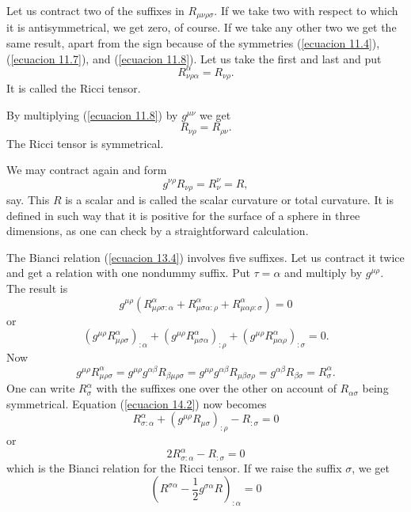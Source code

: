 Let us contract two of the suffixes in $R_{\mu\nu\rho\sigma}$. If we take two with respect to which it is 
antisymmetrical, we get zero, of course. If we take any other two we get the same result, apart from the sign because 
of the symmetries (\ref{ecuacion 11.4}), (\ref{ecuacion 11.7}), and (\ref{ecuacion 11.8}). Let us take the first and 
last and put
\[
R^{\alpha}_{\nu\rho\alpha} = R_{\nu\rho}.
\]
It is called the Ricci tensor.

By multiplying (\ref{ecuacion 11.8}) by $g^{\mu\nu}$ we get 
\begin{equation}
 \label{ecuacion 14.1}
 R_{\nu\rho} = R_{\rho\nu}.
\end{equation}
The Ricci tensor is symmetrical.

We may contract again and form
\[
g^{\nu\rho}R_{\nu\rho} = R^{\nu}_{\nu} = R,
\]
say. This $R$ is a scalar and is called the scalar curvature or total curvature. It is defined in such way that it is 
positive for the surface of a sphere in three dimensions, as one can check by a straightforward calculation.

The Bianci relation (\ref{ecuacion 13.4}) involves five suffixes. Let us contract it twice and get a relation with one 
nondummy suffix. Put $\tau = \alpha$ and multiply by $g^{\mu\rho}$. The result is
\[
g^{\mu\rho}\left(
R^{\alpha}_{\mu\rho\sigma:\alpha} +
R^{\alpha}_{\mu\sigma\alpha:\rho} +
R^{\alpha}_{\mu\alpha\rho:\sigma}
\right) = 0
\]
or
\begin{equation}
 \label{ecuacion 14.2}
 \left( g^{\mu\rho} R^{\alpha}_{\mu\rho\sigma}\right)_{:\alpha} +
 \left( g^{\mu\rho} R^{\alpha}_{\mu\sigma\alpha}\right)_{:\rho} +
 \left( g^{\mu\rho} R^{\alpha}_{\mu\alpha\rho}\right)_{:\sigma}
 = 0 .
\end{equation}
Now
\[
 g^{\mu\rho} R^{\alpha}_{\mu\rho\sigma} =
  g^{\mu\rho}g^{\alpha\beta}R_{\beta\mu\rho\sigma} =
  g^{\mu\rho}g^{\alpha\beta}R_{\mu\beta\sigma\rho} =
  g^{\alpha\beta}R_{\beta\sigma} = R^{\alpha}_{\sigma}.
\]
One can write $R^{\alpha}_{\sigma}$ with the suffixes one over the other on account of $R_{\alpha\sigma}$ being 
symmetrical. Equation (\ref{ecuacion 14.2}) now becomes
\[
 R^{\alpha}_{\sigma:\alpha} + \left( g^{\mu\rho} R_{\mu\sigma} \right)_{:\rho} - R_{:\sigma} = 0
\]
or
\[
 2 R^{\alpha}_{\sigma:\alpha} - R_{:\sigma} = 0
\]
which is the Bianci relation for the Ricci tensor. If we raise the suffix $\sigma$, we get
\begin{equation}
 \label{ecuacion 14.3}
 \left( R^{\sigma \alpha} - \frac{1}{2} g^{\sigma \alpha} R\right)_{:\alpha} = 0
\end{equation}

